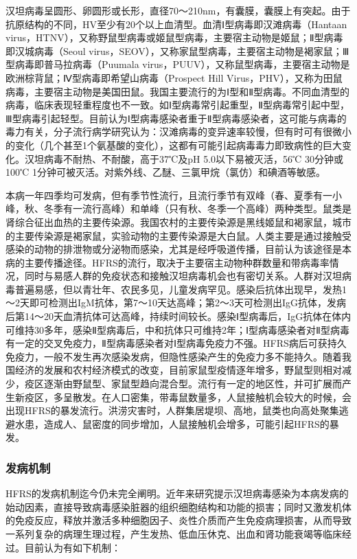 汉坦病毒呈圆形、卵圆形或长形，直径70～210nm，有囊膜，囊膜上有突起。由于抗原结构的不同，HV至少有20个以上血清型。血清Ⅰ型病毒即汉滩病毒（Hantaan
virus，HTNV），又称野鼠型病毒或姬鼠型病毒，主要宿主动物是姬鼠；Ⅱ型病毒即汉城病毒（Seoul
virus，SEOV），又称家鼠型病毒，主要宿主动物是褐家鼠；Ⅲ型病毒即普马拉病毒（Puumala
virus，PUUV），又称鼠型病毒，主要宿主动物是欧洲棕背鼠；Ⅳ型病毒即希望山病毒（Prospect
Hill
Virus，PHV），又称为田鼠病毒，主要宿主动物是美国田鼠。我国主要流行的为Ⅰ型和Ⅱ型病毒。不同血清型的病毒，临床表现轻重程度也不一致。如Ⅰ型病毒常引起重型，Ⅱ型病毒常引起中型，Ⅲ型病毒引起轻型。目前认为Ⅰ型病毒感染者重于Ⅱ型病毒感染者，这可能与病毒的毒力有关，分子流行病学研究认为：汉滩病毒的变异速率较慢，但有时可有很微小的变化（几个甚至1个氨基酸的变化），这都有可能引起病毒毒力即致病性的巨大变化。汉坦病毒不耐热、不耐酸，高于37℃及pH
5.0以下易被灭活，56℃ 30分钟或100℃
1分钟可被灭活。对紫外线、乙醚、三氯甲烷（氯仿）和碘酒等敏感。

本病一年四季均可发病，但有季节性流行，且流行季节有双峰（春、夏季有一小峰，秋、冬季有一流行高峰）和单峰（只有秋、冬季一个高峰）两种类型。鼠类是肾综合征出血热的主要传染源。我国农村的主要传染源是黑线姬鼠和褐家鼠，城市的主要传染源是褐家鼠，实验动物的主要传染源是大白鼠。人类主要是通过接触受感染的动物的排泄物或分泌物而感染，尤其是经呼吸道传播，目前认为该途径是本病的主要传播途径。HFRS的流行，取决于主要宿主动物种群数量和带病毒率情况，同时与易感人群的免疫状态和接触汉坦病毒机会也有密切关系。人群对汉坦病毒普遍易感，但以青壮年、农民多见，儿童发病罕见。感染后抗体出现早，发热1～2天即可检测出IgM抗体，第7～10天达高峰；第2～3天可检测出IgG抗体，发病后第14～20天血清抗体可达高峰，持续时间较长。感染Ⅰ型病毒后，IgG抗体在体内可维持30多年，感染Ⅱ型病毒后，中和抗体只可维持2年；Ⅰ型病毒感染者对Ⅱ型病毒有一定的交叉免疫力，Ⅱ型病毒感染者对Ⅰ型病毒免疫力不强。HFRS病后可获持久免疫力，一般不发生再次感染发病，但隐性感染产生的免疫力多不能持久。随着我国经济的发展和农村经济模式的改变，目前家鼠型疫情逐年增多，野鼠型则相对减少，疫区逐渐由野鼠型、家鼠型趋向混合型。流行有一定的地区性，并可扩展而产生新疫区，多呈散发。在人口密集，带毒鼠数量多，人鼠接触机会较大的时候，会出现HFRS的暴发流行。洪涝灾害时，人群集居堤坝、高地，鼠类也向高处聚集逃避水患，造成人、鼠密度的同步增加，人鼠接触机会增多，可能引起HFRS的暴发。

\subsubsection{发病机制}

HFRS的发病机制迄今仍未完全阐明。近年来研究提示汉坦病毒感染为本病发病的始动因素，直接导致病毒感染脏器的组织细胞结构和功能的损害；同时又激发机体的免疫反应，释放并激活多种细胞因子、炎性介质而产生免疫病理损害，从而导致一系列复杂的病理生理过程，产生发热、低血压休克、出血和肾功能衰竭等临床经过。目前认为有如下机制：

